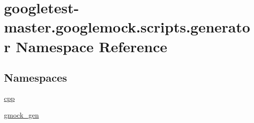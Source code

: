 \hypertarget{namespacegoogletest-master_1_1googlemock_1_1scripts_1_1generator}{}\section{googletest-\/master.googlemock.\+scripts.\+generator Namespace Reference}
\label{namespacegoogletest-master_1_1googlemock_1_1scripts_1_1generator}
\subsection*{Namespaces}
\begin{DoxyCompactItemize}
\item 
 \mbox{\hyperlink{namespacegoogletest-master_1_1googlemock_1_1scripts_1_1generator_1_1cpp}{cpp}}
\item 
 \mbox{\hyperlink{namespacegoogletest-master_1_1googlemock_1_1scripts_1_1generator_1_1gmock__gen}{gmock\+\_\+gen}}
\end{DoxyCompactItemize}
